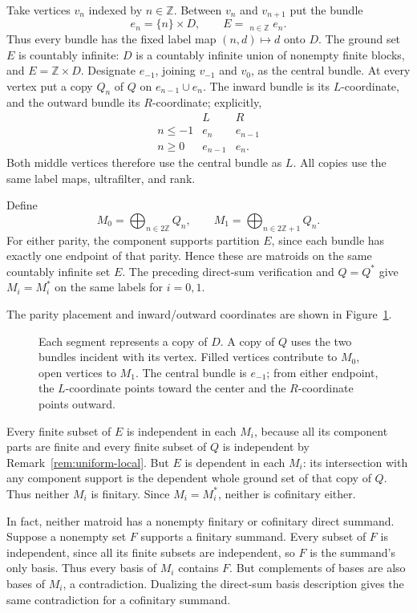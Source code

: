 Take vertices $v_n$ indexed by $n\in\mathbb Z$. Between $v_n$ and
$v_{n+1}$ put the bundle
\[
 e_n=\{n\}\times D,
 \qquad E=\mathop{\dot\bigcup}_{n\in\mathbb Z}e_n.
\]
Thus every bundle has the fixed label map $(n,d)\mapsto d$ onto $D$.
The ground set $E$ is countably infinite: $D$ is a countably infinite
union of nonempty finite blocks, and $E=\mathbb Z\times D$.
Designate $e_{-1}$, joining $v_{-1}$ and $v_0$, as the central bundle.
At every vertex put a copy $Q_n$ of $Q$ on $e_{n-1}\cup e_n$.
The inward bundle is its $L$-coordinate, and the outward bundle its
$R$-coordinate; explicitly,
\[
\begin{array}{c|cc}
 &L&R\\\hline
 n\le -1&e_n&e_{n-1}\\
 n\ge 0&e_{n-1}&e_n.
\end{array}
\]
Both middle vertices therefore use the central bundle as $L$.
All copies use the same label maps, ultrafilter, and rank.



Define
\[
 M_0=\bigoplus_{n\in 2\mathbb Z}Q_n,
 \qquad
 M_1=\bigoplus_{n\in 2\mathbb Z+1}Q_n.
\]
For either parity, the component supports partition $E$, since each
bundle has exactly one endpoint of that parity. Hence these are
matroids on the same countably infinite set $E$. The preceding
direct-sum verification and $Q=Q^*$ give $M_i=M_i^*$ on the same
labels for $i=0,1$.

The parity placement and inward/outward coordinates are shown in
Figure~\ref{fig:double-ray}.

\begin{figure}[htbp]
\centering

\caption{Each segment represents a copy of $D$. A copy of $Q$ uses
the two bundles incident with its vertex. Filled vertices contribute
to $M_0$, open vertices to $M_1$. The central bundle is $e_{-1}$;
from either endpoint, the $L$-coordinate points toward the center and
the $R$-coordinate points outward.}
\label{fig:double-ray}
\end{figure}

Every finite subset of $E$ is independent in each $M_i$, because
all its component parts are finite and every finite subset of $Q$ is
independent by Remark~\ref{rem:uniform-local}. But $E$ is dependent
in each $M_i$: its intersection with any component support is the
dependent whole ground set of that copy of $Q$. Thus neither $M_i$
is finitary. Since $M_i=M_i^*$, neither is cofinitary either.

In fact, neither matroid has a nonempty finitary or cofinitary direct
summand. Suppose a nonempty set $F$ supports a finitary summand.
Every subset of $F$ is independent, since all its finite subsets are
independent, so $F$ is the summand's only basis. Thus every basis of
$M_i$ contains $F$. But complements of bases are also bases of $M_i$,
a contradiction. Dualizing the direct-sum basis description gives the
same contradiction for a cofinitary summand.

